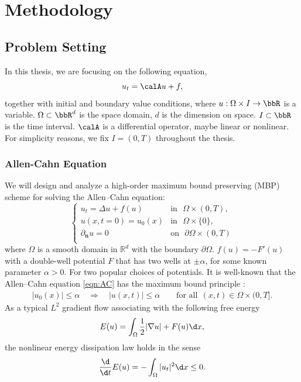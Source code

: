 \chapter{Methodology}

\section{Problem Setting}

In this thesis, we are focusing on the following equation, 
\begin{equation}\label{eq:parabolic}
    u_t = \calA u + f,
\end{equation}
together with initial and boundary value conditions, 
where $u:\Omega\times I   \to \bbR$ is a variable. 
$\Omega \subset \bbR^d$ is the space domain, 
$d$ is the dimension on space. 
$I \subset \bbR$ is the time interval. 
$\calA$ is a differential operator, maybe linear or nonlinear. 
For simplicity reasons, we fix $I = (0, T)$ throughout the thesis. 


\subsection{Allen-Cahn Equation}

We will design and analyze a high-order maximum bound preserving (MBP) scheme for solving the Allen--Cahn equation:
\begin{equation}\label{eqn:AC}
    \begin{cases}
    u_t = \Delta u + f(u) &
        \mbox{in~~} \Omega\times(0,T),\\
    u(x,t=0) = u_0(x)   &
        \mbox{in~~} \Omega\times\{0\},\\
    \partial_{\mathbf{n}}u = 0  &
        \mbox{on~~} \partial\Omega\times(0,T)\\
  \end{cases}
\end{equation}
where $\Omega$ is a smooth domain in $\mathbb{R}^d$ with the boundary $\partial\Omega$.
$f(u)=-F'(u)$ with a double-well potential $F$ that has two wells at $\pm\alpha$, for {some known parameter $\alpha>0$}. %
For two popular choices of potentials. It is well-known that the Allen--Cahn equation \eqref{eqn:AC} has the maximum bound principle \cite{DuJuLiQiao:2020}:
\begin{align}\label{eqn:max-AC}
|u_0(x)|\le \alpha\quad \Longrightarrow\quad |u(x,t)| \le \alpha\qquad \text{for all} ~~(x,t)\in \Omega\times(0,T].
\end{align}
As a typical $L^2$ gradient flow associating with the following free energy
$$E(u)=\int_\Omega\frac{1}{2}|\nabla u|+F(u)\d x,$$
 the nonlinear energy dissipation law holds in the sense
\begin{equation}\label{enlaw}\frac{\d}{\d t}E(u)=-\int_\Omega|u_t|^2\d x\le 0.\end{equation}

